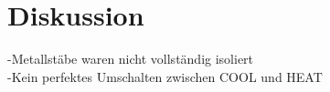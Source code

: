 \section{Diskussion} \label{sec:diskussion}

-Metallstäbe waren nicht vollständig isoliert\\
-Kein perfektes Umschalten zwischen COOL und HEAT